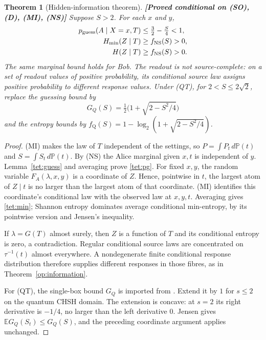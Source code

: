 \documentclass[11pt,a4paper]{article}
\newtheorem{theorem}{Theorem}[section]
\theoremstyle{definition}
\theoremstyle{remark}\newtheorem{remark}[theorem]{Remark}
\newcommand{\status}[1]{\textbf{[#1]}\quad}
\newcommand{\Prb}{\mathbb P}
\newcommand{\E}{\mathbb E}
\newcommand{\fNS}{f_{\mathrm{NS}}}
\newcommand{\fQ}{f_{\mathrm{Q}}}
\begin{document}
\begin{theorem}[Hidden-information theorem]\label{tet:hidden}
\status{Proved conditional on (SO), (D), (MI), (NS)}
Suppose $S>2$. For each $x$ and $y$,
\begin{align}
 p_{\rm guess}(A\mid X=x,T)&\le\tfrac32-\tfrac S4<1,\label{tet:pg}\\
 H_{\min}(Z\mid T)&\ge\fNS(S)>0,\label{tet:min}\\
 H(Z\mid T)&\ge\fNS(S)>0.\label{tet:shannonold}
\end{align}
The same marginal bound holds for Bob. The readout is not source-complete: on a set of readout values of positive probability, its conditional source law assigns positive probability to different response values. Under (QT), for $2<S\le2\sqrt2$, replace the guessing bound by
\[
 G_Q(S)=\tfrac12\bigl(1+\sqrt{2-S^2/4}\bigr)
\]
and the entropy bounds by
$\fQ(S)=1-\log_2(1+\sqrt{2-S^2/4})$.
\end{theorem}
\begin{proof}
(MI) makes the law of $T$ independent of the settings, so
$P=\int P_t\,d\Prb(t)$ and $S=\int S_t\,d\Prb(t)$. By (NS) the Alice marginal given $x,t$ is independent of $y$. Lemma~\ref{tet:guess} and averaging prove \eqref{tet:pg}. For fixed $x,y$, the random variable $F_A(\lambda,x,y)$ is a coordinate of $Z$. Hence, pointwise in $t$, the largest atom of $Z\mid t$ is no larger than the largest atom of that coordinate. (MI) identifies this coordinate's conditional law with the observed law at $x,y,t$. Averaging gives \eqref{tet:min}; Shannon entropy dominates average conditional min-entropy, by its pointwise version and Jensen's inequality.

If $\lambda=G(T)$ almost surely, then $Z$ is a function of $T$ and its conditional entropy is zero, a contradiction. Regular conditional source laws are concentrated on $\tau^{-1}(t)$ almost everywhere. A nondegenerate finite conditional response distribution therefore supplies different responses in those fibres, as in Theorem~\ref{op:information}.

For (QT), the single-box bound $G_Q$ is imported from \cite[Eq.~(6)]{Pironio10}. Extend it by $1$ for $s\le2$ on the quantum CHSH domain. The extension is concave: at $s=2$ its right derivative is $-1/4$, no larger than the left derivative $0$. Jensen gives $\E G_Q(S_t)\le G_Q(S)$, and the preceding coordinate argument applies unchanged.
\end{proof}
\end{document}
